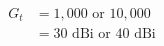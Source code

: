 \documentclass[preview]{standalone}
\begin{document}
\begin{align*}
G_t &= 1,000 \text{ or } 10,000\\ &= 30 \text{ dBi or } 40 \text{ dBi}
\end{align*}
\end{document}
